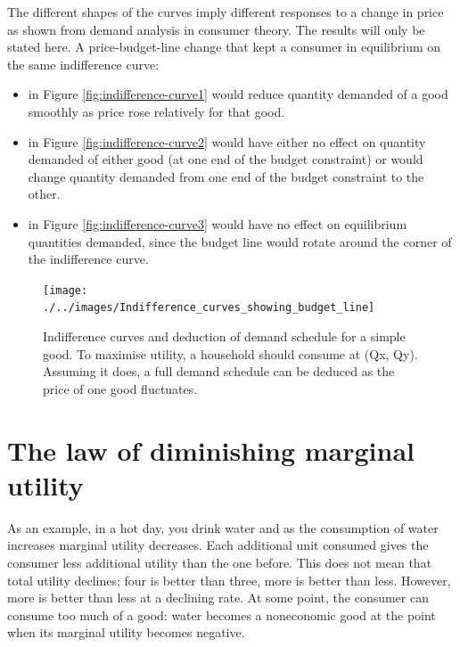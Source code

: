 \documentclass[11pt,]{book}
\theoremstyle{definition}
\theoremstyle{definition}
\theoremstyle{definition}
\theoremstyle{remark}
\begin{document}
The different shapes of the curves imply different responses to a change
in price as shown from demand analysis in consumer theory. The results
will only be stated here. A price-budget-line change that kept a
consumer in equilibrium on the same indifference curve:

\begin{itemize}
\item
  in Figure \ref{fig:indifference-curve1} would reduce quantity demanded
  of a good smoothly as price rose relatively for that good.
\item
  in Figure \ref{fig:indifference-curve2} would have either no effect on
  quantity demanded of either good (at one end of the budget constraint)
  or would change quantity demanded from one end of the budget
  constraint to the other.
\item
  in Figure \ref{fig:indifference-curve3} would have no effect on
  equilibrium quantities demanded, since the budget line would rotate
  around the corner of the indifference curve.
\end{itemize}

\begin{figure}

{\centering \texttt{[image: ./../images/Indifference\_curves\_showing\_budget\_line]} 

}

\caption{Indifference curves and deduction of demand schedule for a simple good. To maximise utility, a household should consume at (Qx, Qy). Assuming it does, a full demand schedule can be deduced as the price of one good fluctuates.}\label{fig:expansion-path}
\end{figure}

\section{The law of diminishing marginal
utility}\label{the-law-of-diminishing-marginal-utility}

As an example, in a hot day, you drink water and as the consumption of
water increases marginal utility decreases. Each additional unit
consumed gives the consumer less additional utility than the one before.
This does not mean that total utility declines; four is better than
three, more is better than less. However, more is better than less at a
declining rate. At some point, the consumer can consume too much of a
good: water becomes a noneconomic good at the point when its marginal
utility becomes negative.
\end{document}
